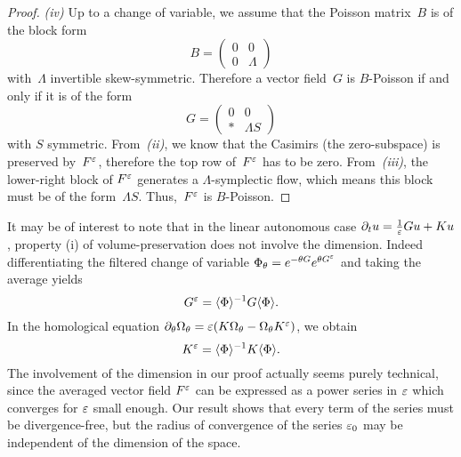 \begin{proof}
  \medskip\noindent%
  \textit{(iv)}\indent%
  Up to a change of variable, we assume that the Poisson matrix~$B$ is
  of the block form 
  \begin{equation*}
    B = \left(\begin{array}{c|c}
      0 & 0 \\ \hline 0 & \Lambda
    \end{array}\right)
  \end{equation*}
  with~$\Lambda$ invertible skew-symmetric. Therefore a vector field~$G$
  is $B$-Poisson if and only if it is of the form
  \begin{equation*}
    G = \left(\begin{array}{c|c}
      0 & 0 \\ \hline * & \Lambda S
    \end{array}\right)
  \end{equation*}
  with $S$ symmetric. From~\textit{(ii)}, we know that the Casimirs (the
  zero-subspace) is preserved by~$F^\varepsilon$, therefore the top row
  of~$F^\varepsilon$ has to be zero. From~\textit{(iii)}, the lower-right block
  of $F^\varepsilon$ generates a $\Lambda$-symplectic flow, which means this
  block must be of the form~$\Lambda S$. Thus,~$F^\varepsilon$ is $B$-Poisson. 

\end{proof}


\begin{remark}
  It may be of interest to note that in the linear autonomous case $\partial_t
  u = \frac{1}{\varepsilon} Gu + Ku$, property (i) of volume-preservation does
  not involve the dimension. Indeed differentiating the filtered change of
  variable $\Phi_\theta = e^{-\theta G} e^{\theta G^\varepsilon}$ and taking
  the average yields 
  \begin{equation*}
    G^\varepsilon = \langle \Phi \rangle^{-1} G \langle \Phi \rangle .
  \end{equation*}
  In the homological equation $\partial_\theta \Omega_\theta = \varepsilon (
  K \Omega_\theta - \Omega_\theta K^\varepsilon )$, we obtain 
  \begin{equation*}
    K^\varepsilon = \langle \Phi \rangle^{-1} K \langle \Phi \rangle .
  \end{equation*}
  The involvement of the dimension in our proof actually
  seems purely technical, since the averaged vector field $F^\varepsilon$ can be
  expressed as a power series in $\varepsilon$ which converges for $\varepsilon$ small
  enough. Our result shows that every term of the series must be
  divergence-free, but the radius of convergence of the series $\varepsilon_0$ may
  be independent of the dimension of the space.
\end{remark}




